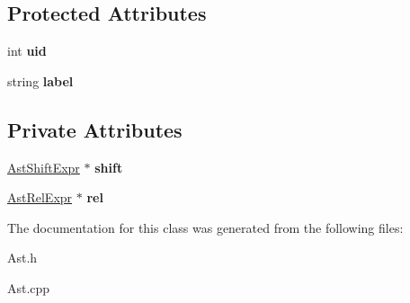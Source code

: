 \subsection*{Protected Attributes}
\begin{DoxyCompactItemize}
\item 
\hypertarget{classAST_a847b778f1c3dd5a19de32de432ee6e15}{int {\bfseries uid}}\label{classAST_a847b778f1c3dd5a19de32de432ee6e15}

\item 
\hypertarget{classAST_ab2e239ccc0688d2341724432ff5a1a31}{string {\bfseries label}}\label{classAST_ab2e239ccc0688d2341724432ff5a1a31}

\end{DoxyCompactItemize}
\subsection*{Private Attributes}
\begin{DoxyCompactItemize}
\item 
\hypertarget{classAstRelExpr_aa22466011d80f82a5e67da7b3bc5e972}{\hyperlink{classAstShiftExpr}{Ast\-Shift\-Expr} $\ast$ {\bfseries shift}}\label{classAstRelExpr_aa22466011d80f82a5e67da7b3bc5e972}

\item 
\hypertarget{classAstRelExpr_abf2a5125056b14661d17be51fbe8b61e}{\hyperlink{classAstRelExpr}{Ast\-Rel\-Expr} $\ast$ {\bfseries rel}}\label{classAstRelExpr_abf2a5125056b14661d17be51fbe8b61e}

\end{DoxyCompactItemize}


The documentation for this class was generated from the following files\-:\begin{DoxyCompactItemize}
\item 
Ast.\-h\item 
Ast.\-cpp\end{DoxyCompactItemize}
